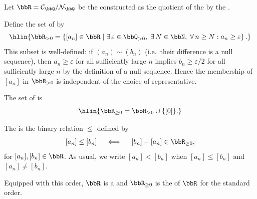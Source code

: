 \begin{definition} \label{definition:standard_order_on_real_numbers}
    Let $\bbR = \mathcal{C}_\bbQ / \mathcal{N}_\bbQ$ be the  constructed as the quotient of the  by the .

    Define the set of  by
    $$\hlin{\bbR_{> 0} = \left\{ [a_n] \in \bbR \;\middle|\; \exists\, \varepsilon \in \bbQ_{> 0},\; \exists\, N \in \bbN,\; \forall\, n \ge N : a_n \ge \varepsilon \right\}.}$$
    This subset is well-defined: if $(a_n) \sim (b_n)$ (i.e.\ their difference is a null sequence), then $a_n \ge \varepsilon$ for all sufficiently large $n$ implies $b_n \ge \varepsilon/2$ for all sufficiently large $n$ by the definition of a null sequence. Hence the membership of $[a_n]$ in $\bbR_{>0}$ is independent of the choice of representative.

    The set of  is
    $$\hlin{\bbR_{\ge 0} = \bbR_{> 0} \cup \{ [0] \}.}$$

    The  is the binary relation $\le$ defined by
    $$[a_n] \le [b_n] \quad\iff\quad [b_n] - [a_n] \in \bbR_{\ge 0},$$
    for $[a_n], [b_n] \in \bbR$. As usual, we write $[a_n] < [b_n]$ when $[a_n] \le [b_n]$ and $[a_n] \neq [b_n]$.

    Equipped with this order, $\bbR$ is a  and $\bbR_{\geq 0}$ is the  of $\bbR$ for the standard order.
\end{definition}